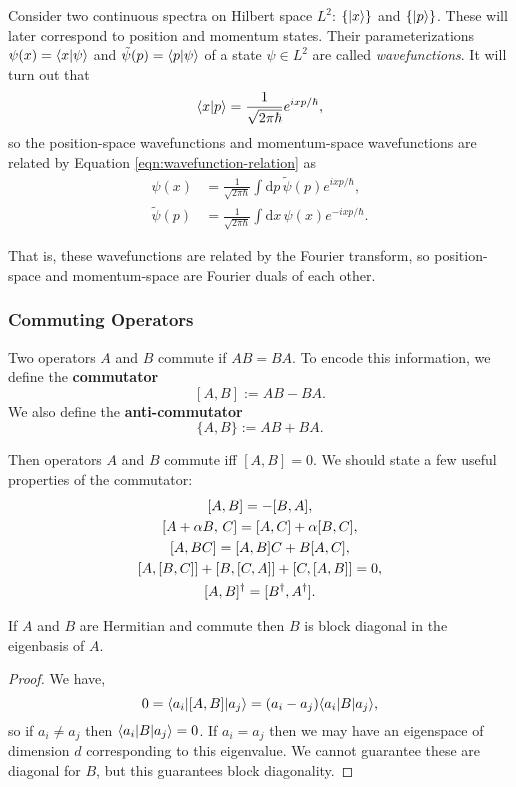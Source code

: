 \begin{example}
    Consider two continuous spectra on Hilbert space $L^2$: $\{\lvert x \rangle\}$ and $\{\lvert p \rangle\}$. These will later correspond to position and momentum states. Their parameterizations $\psi(x) = \langle x\vert\psi \rangle$ and $\tilde{\psi}(p) = \langle p\vert\psi \rangle$ of a state $\psi\in L^2$ are called \emph{wavefunctions}. It will turn out that
    $$\langle x\vert p \rangle = \frac{1}{\sqrt{2\pi\hbar}}e^{ixp / \hbar},$$
    so the position-space wavefunctions and momentum-space wavefunctions are related by Equation \ref{eqn:wavefunction-relation} as
    \begin{align*}
        \psi(x) &= \frac{1}{\sqrt{2\pi\hbar}}\int \mathrm dp\,\tilde{\psi}(p) e^{ixp / \hbar}, \\ 
        \tilde\psi(p) &= \frac{1}{\sqrt{2\pi\hbar}}\int \mathrm dx\,\psi(x) e^{-ixp / \hbar}.
    \end{align*}

    That is, these wavefunctions are related by the Fourier transform, so position-space and momentum-space are Fourier duals of each other.
\end{example}

\subsubsection{Commuting Operators}
Two operators $A$ and $B$ commute if $AB = BA$. To encode this information, we define the \textbf{commutator}
$$[A, B] := AB - BA.$$
We also define the \textbf{anti-commutator}
$$\{A, B\} := AB + BA.$$

Then operators $A$ and $B$ commute iff $[A, B] = 0.$ We should state a few useful properties of the commutator:
\begin{equation}
    \begin{gathered}
        \relax
        [A,B] = -[B,A],\\
        [A+\alpha B,\,C] = [A,C] + \alpha [B,C], \\
        [A, BC] = [A, B]C + B[A, C], \\
        [A, [B, C]] + [B, [C, A]] + [C, [A, B]] = 0, \\
        [A, B]^\dagger = [B^\dagger, A^\dagger].
    \end{gathered}
\end{equation}

\begin{theorem}
    If $A$ and $B$ are Hermitian and commute then $B$ is block diagonal in the eigenbasis of $A$.
    \label{thm:simultaneous_diagonal}
\end{theorem}
\begin{proof}
    We have,
    $$0 = \langle a_i \rvert [A, B] \lvert a_j \rangle = (a_i - a_j) \langle a_i \rvert B \lvert a_j \rangle,$$
    so if $a_i \neq a_j$ then $\langle a_i \rvert B \lvert a_j \rangle = 0$. If $a_i = a_j$ then we may have an eigenspace of dimension $d$ corresponding to this eigenvalue. We cannot guarantee these are diagonal for $B$, but this guarantees block diagonality.
\end{proof}

